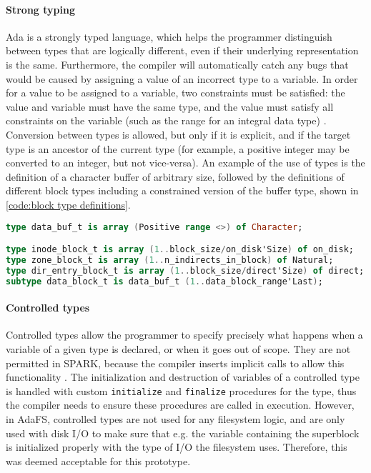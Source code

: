 \paragraph{Strong typing}
Ada is a strongly typed language, which helps the programmer distinguish between types that are logically different, even if their underlying representation is the same.
Furthermore, the compiler will automatically catch any bugs that would be caused by assigning a value of an incorrect type to a variable.
In order for a value to be assigned to a variable, two constraints must be satisfied: the value and variable must have the same type, and the value must satisfy all constraints on the variable (such as the range for an integral data type) \cite{barnes2014}.
Conversion between types is allowed, but only if it is explicit, and if the target type is an ancestor of the current type (for example, a positive integer may be converted to an integer, but not vice-versa).
An example of the use of types is the definition of a character buffer of arbitrary size, followed by the definitions of different block types including a constrained version of the buffer type, shown in \autoref{code:block type definitions}.

\begin{lstlisting}[caption={Block type definitions}, label={code:block type definitions}, language=Ada]
type data_buf_t is array (Positive range <>) of Character;

type inode_block_t is array (1..block_size/on_disk'Size) of on_disk;
type zone_block_t is array (1..n_indirects_in_block) of Natural;
type dir_entry_block_t is array (1..block_size/direct'Size) of direct;
subtype data_block_t is data_buf_t (1..data_block_range'Last);
\end{lstlisting}

\paragraph{Controlled types}
Controlled types allow the programmer to specify precisely what happens when a variable of a given type is declared, or when it goes out of scope.
They are not permitted in SPARK, because the compiler inserts implicit calls to allow this functionality \cite{sparkRM}.
The initialization and destruction of variables of a controlled type is handled with custom \lstinline[language=Ada]{initialize} and \lstinline[language=Ada]{finalize} procedures for the type, thus the compiler needs to ensure these procedures are called in execution.
However, in AdaFS, controlled types are not used for any filesystem logic, and are only used with disk I/O to make sure that e.g. the variable containing the superblock is initialized properly with the type of I/O the filesystem uses.
Therefore, this was deemed acceptable for this prototype.

